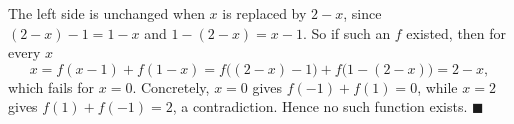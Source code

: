 The left side is unchanged when $x$ is replaced by $2-x$, since $(2-x)-1=1-x$ and $1-(2-x)=x-1$. So if such an $f$ existed, then for every $x$
\[
x=f(x-1)+f(1-x)=f\bigl((2-x)-1\bigr)+f\bigl(1-(2-x)\bigr)=2-x,
\]
which fails for $x=0$. Concretely, $x=0$ gives $f(-1)+f(1)=0$, while $x=2$ gives $f(1)+f(-1)=2$, a contradiction. Hence no such function exists. $\blacksquare$
